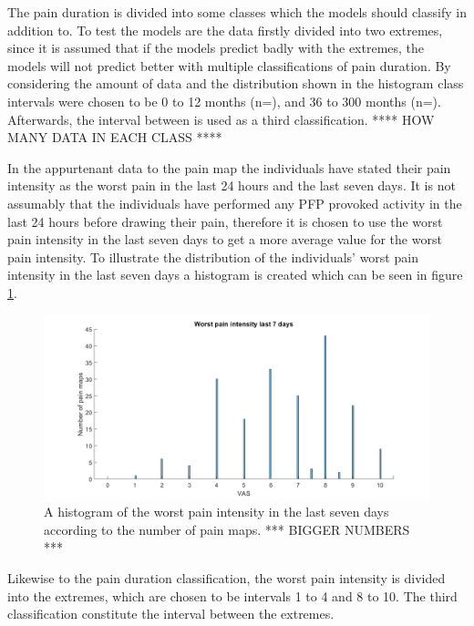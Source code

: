 \noindent
The pain duration is divided into some classes which the models should classify in addition to. To test the models are the data firstly divided into two extremes, since it is assumed that if the models predict badly with the extremes, the models will not predict better with multiple classifications of pain duration. 
By considering the amount of data and the distribution shown in the histogram class intervals were chosen to be 0 to 12 months (n=), and 36 to 300 months (n=). Afterwards, the interval between is used as a third classification. 
**** HOW MANY DATA IN EACH CLASS ****\newline

\noindent
In the appurtenant data to the pain map the individuals have stated their pain intensity as the worst pain in the last 24 hours and the last seven days.
It is not assumably that the individuals have performed any PFP provoked activity in the last 24 hours before drawing their pain, therefore it is chosen to use the worst pain intensity in the last seven days to get a more average value for the worst pain intensity.
To illustrate the distribution of the individuals’ worst pain intensity in the last seven days a histogram is created which can be seen in figure \ref{fig:histopain}.

\begin{figure} [H]
\centering
\includegraphics[width=1\textwidth]{figures/histrogramPain}
\caption{A histogram of the worst pain intensity in the last seven days according to the number of pain maps.  *** BIGGER NUMBERS ***}
\label{fig:histopain}
\end{figure}

\noindent
Likewise to the pain duration classification, the worst pain intensity is divided into the extremes, which are chosen to be intervals 1 to 4 and 8 to 10. The third classification constitute the interval between the extremes.


